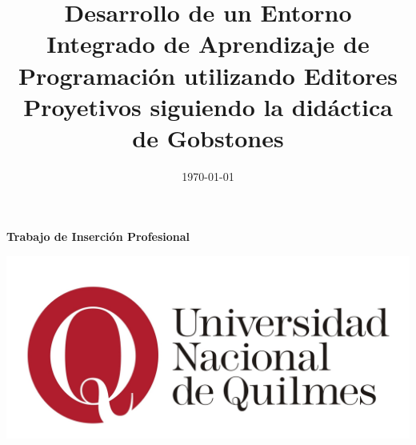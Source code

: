 \documentclass[journal]{IEEEtran}
\title{Desarrollo de un Entorno Integrado de Aprendizaje de Programación
utilizando Editores Proyetivos siguiendo la didáctica de Gobstones}
\date{\today}
\begin{document}
\begin{titlepage}

\newcommand{\HRule}{\rule{\linewidth}{0.5mm}} %

\begin{center}




{ \huge \bfseries Trabajo de Inserción Profesional}\\[0.4cm] %

\bigskip
\bigskip
\bigskip
\bigskip
\bigskip
\bigskip
 


\bigskip
\bigskip
\bigskip

\includegraphics[width=\textwidth,height=\textheight,keepaspectratio]{assets/logo-unq.jpg}\\[1cm]
\end{center}

\newpage
\tableofcontents


\end{titlepage}

\maketitle
 



\newpage
\printbibliography
\end{document}
